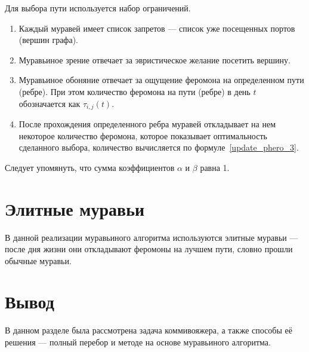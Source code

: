 Для выбора пути используется набор ограничений.
\begin{enumerate}
	\item Каждый муравей имеет список запретов --- список уже посещенных портов (вершин графа).
	\item Муравьиное зрение отвечает за эвристическое желание посетить вершину.
	\item Муравьиное обоняние отвечает за ощущение феромона на определенном пути (ребре). При этом количество феромона на пути (ребре) в день $t$ обозначается как $\tau_{i, j} (t)$.
	\item После прохождения определенного ребра муравей откладывает на нем некоторое количество феромона, которое показывает оптимальность сделанного выбора, количество вычисляется по формуле~\eqref{update_phero_3}.
\end{enumerate}

Следует упомянуть, что сумма коэффициентов $\alpha$ и $\beta$ равна 1.

\section*{Элитные муравьи}
В данной реализации муравьиного алгоритма используются элитные муравьи --- после дня жизни они откладывают феромоны на лучшем пути, словно прошли обычные муравьи.

\section*{Вывод}

В данном разделе была рассмотрена задача коммивояжера, а также способы её решения --- полный перебор и методе на основе муравьиного алгоритма.
